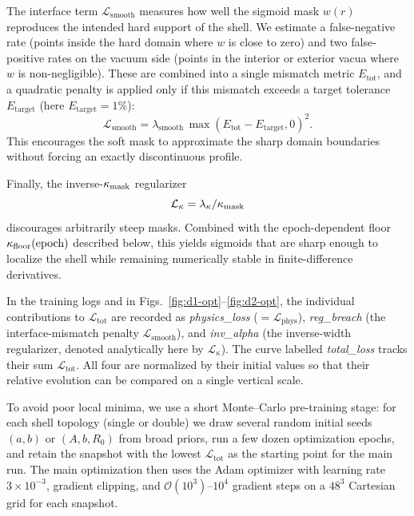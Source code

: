 \documentclass[11pt]{article}
\begin{document}
The interface term $\mathcal{L}_\text{smooth}$ measures how well the sigmoid mask $w(r)$ reproduces the intended hard support of the shell. We estimate a false-negative rate (points inside the hard domain where $w$ is close to zero) and two false-positive rates on the vacuum side (points in the interior or exterior vacua where $w$ is non-negligible). These are combined into a single mismatch metric $E_\text{tot}$, and a quadratic penalty is applied only if this mismatch exceeds a target tolerance $E_\text{target}$ (here $E_\text{target}=1\%$):
\begin{equation}
\mathcal{L}_\text{smooth} = \lambda_\text{smooth}\,\max(E_\text{tot} - E_\text{target},0)^2.
\end{equation}
This encourages the soft mask to approximate the sharp domain boundaries without forcing an exactly discontinuous profile.

Finally, the inverse-$\kappa_{\rm mask}$ regularizer
\begin{equation}
\mathcal{L}_{\kappa} = \lambda_{\kappa}/\kappa_{\rm mask}
\end{equation}
discourages arbitrarily steep masks. Combined with the epoch-dependent floor $\kappa_{\rm floor}(\text{epoch})$ described below, this yields sigmoids that are sharp enough to localize the shell while remaining numerically stable in finite-difference derivatives.

In the training logs and in Figs.~\ref{fig:d1-opt}--\ref{fig:d2-opt}, the individual contributions to $\mathcal{L}_\text{tot}$ are recorded as \emph{physics\_loss} ($=\mathcal{L}_\text{phys}$), \emph{reg\_breach} (the interface-mismatch penalty $\mathcal{L}_\text{smooth}$), and \emph{inv\_alpha} (the inverse-width regularizer, denoted analytically here by $\mathcal{L}_{\kappa}$). The curve labelled \emph{total\_loss} tracks their sum $\mathcal{L}_\text{tot}$. All four are normalized by their initial values so that their relative evolution can be compared on a single vertical scale.

To avoid poor local minima, we use a short Monte--Carlo pre-training stage: for each shell topology (single or double) we draw several random initial seeds $(a,b)$ or $(A,b,R_0)$ from broad priors, run a few dozen optimization epochs, and retain the snapshot with the lowest $\mathcal{L}_\text{tot}$ as the starting point for the main run. The main optimization then uses the Adam optimizer with learning rate $3\times10^{-3}$, gradient clipping, and $\mathcal{O}(10^3)$--$10^4$ gradient steps on a $48^3$ Cartesian grid for each snapshot.
\end{document}
